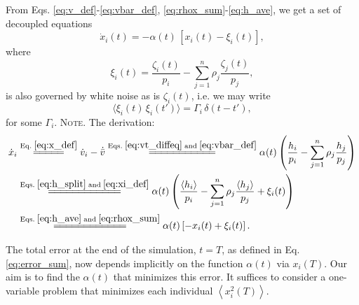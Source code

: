 \documentclass[reprint, superscriptaddress, floatfix]{revtex4-1}
\newcommand{\note}[1]{{\color{DarkGreen}\footnotesize \textsc{Note.} #1}}
\begin{document}
From Eqs.
\eqref{eq:v_def}-\eqref{eq:vbar_def},
\eqref{eq:rhox_sum}-\eqref{eq:h_ave},
we get a set of decoupled equations
%
\begin{equation}
  \dot x_i(t)
  =
  -\alpha(t) \, \left[ x_i(t) - \xi_i(t) \right]
  ,
\label{eq:dxdt_WL}
\end{equation}
where
\begin{equation}
  \xi_i(t)
  =
  \frac{ \zeta_i(t) }
       { p_i }
  -
  \sum_{ j = 1 }^n
    \rho_j
    \frac{ \zeta_j(t) }
         {     p_j    }
  ,
\label{eq:xi_def}
\end{equation}
%
is also governed by white noise as is $\zeta_i(t)$,
i.e. we may write
$$
  \langle \xi_i(t) \, \xi_i(t') \rangle = \Gamma_i \, \delta(t - t'),
$$
for some $\Gamma_i$.
%
\note{The derivation:
$$
\begin{aligned}
  \dot x_i
  &\stackrel{\mathrm{Eq.\; \eqref{eq:x_def}}}
            {=\joinrel=\joinrel=\joinrel=\joinrel=}
  \dot v_i - \dot{ \bar v }
  \stackrel{\mathrm{Eqs.\; \eqref{eq:vt_diffeq}\; and\; \eqref{eq:vbar_def}}}
            {=\joinrel=\joinrel=\joinrel=\joinrel=\joinrel=\joinrel=\joinrel=\joinrel=\joinrel=\joinrel=}
  \alpha(t) \left(
    \frac{ h_i } { p_i }
    -
    \sum_{ j = 1 }^n
      \rho_j \frac{ h_j } { p_j }
  \right)
  \\
  &\stackrel{\mathrm{Eqs.\; \eqref{eq:h_split} \; and \; \eqref{eq:xi_def}}}
            {=\joinrel=\joinrel=\joinrel=\joinrel=\joinrel=\joinrel=\joinrel=\joinrel=\joinrel=\joinrel=\joinrel=}
  \alpha(t) \left(
    \frac{ \langle h_i \rangle } { p_i }
    -
    \sum_{ j = 1 }^n
      \rho_j \frac{ \langle h_j \rangle } { p_j }
    +
    \xi_i(t)
  \right)
  \\
  &\stackrel{\mathrm{Eqs.\; \eqref{eq:h_ave} \;and\; \eqref{eq:rhox_sum}}}
            {=\joinrel=\joinrel=\joinrel=\joinrel=\joinrel=\joinrel=\joinrel=\joinrel=\joinrel=\joinrel=\joinrel=}
  \alpha(t) \left[ -x_i(t) + \xi_i(t) \right].
\end{aligned}
$$
}


The total error
at the end of the simulation, $t = T$,
as defined in Eq. \eqref{eq:error_sum},
now depends implicitly on the function $\alpha(t)$
via $x_i(T)$.
%
Our aim is to find the $\alpha(t)$
that minimizes this error.
%
It suffices to consider
a one-variable problem that
minimizes each individual
$\left\langle x_i^2(T) \right\rangle$.
\end{document}

